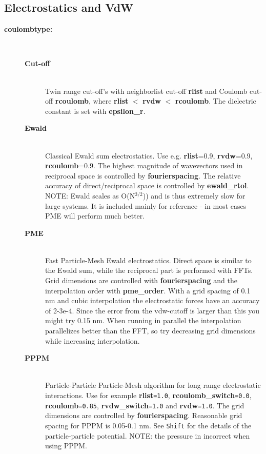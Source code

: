 \subsection{Electrostatics and VdW}
\begin{description}
\item[{\bf coulombtype:}]\mbox{}\\
\vspace{-2ex}\begin{description}
\item[{\bf Cut-off}]\mbox{}\\
Twin range cut-off's with neighborlist cut-off {\bf rlist} and 
Coulomb cut-off {\bf rcoulomb},
where {\bf rlist} {\tt $<$} {\bf rvdw} {\tt $<$} {\bf rcoulomb}.
The dielectric constant is set with {\bf epsilon\_r}.
\item[{\bf Ewald}]\mbox{}\\
Classical Ewald sum electrostatics. Use e.g. {\bf rlist}=0.9,
{\bf rvdw}=0.9, {\bf rcoulomb}=0.9. The highest magnitude of
wavevectors used in reciprocal space is controlled by {\bf fourierspacing}.
The relative accuracy of direct/reciprocal space
is controlled by {\bf ewald\_rtol}. NOTE: Ewald scales as O(N$^{3/2}$)) and
is thus extremely slow for large systems. It is included mainly for
reference - in most cases PME will perform much better.
\item[{\bf PME} ]\mbox{}\\
Fast Particle-Mesh Ewald electrostatics. Direct space is similar
to the Ewald sum, while the reciprocal part is performed with
FFTs. Grid dimensions are controlled with {\bf fourierspacing} and the
interpolation order with {\bf pme\_order}. With a grid spacing of 0.1
nm and cubic interpolation the electrostatic forces have an accuracy
of 2-3e-4. Since the error from the vdw-cutoff is larger than this you
might try 0.15 nm. When running in parallel the interpolation
parallelizes better than the FFT, so try decreasing grid dimensions
while increasing interpolation.
\item[{\bf PPPM}]\mbox{}\\
Particle-Particle Particle-Mesh algorithm for long range
electrostatic interactions.
Use for example {\bf rlist}{\tt =1.0}, {\bf rcoulomb\_switch}{\tt =0.0},
{\bf rcoulomb}{\tt =0.85}, {\bf rvdw\_switch}{\tt =1.0}
and {\bf rvdw}{\tt =1.0}. The grid
dimensions are controlled by {\bf fourierspacing}.
Reasonable grid spacing for PPPM is 0.05-0.1 nm.
See {\tt Shift} for the details of the particle-particle potential.
NOTE: the pressure in incorrect when using PPPM.

\end{description}
\end{description}
